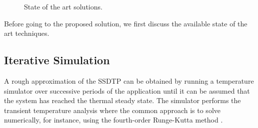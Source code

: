 \begin{figure}[t]
  \centering
  \caption{State of the art solutions.}
\end{figure}
Before going to the proposed solution, we first discuss the available state of the art techniques.

\subsection{Iterative Simulation} \label{sec:hotspot-iterative-solution}
A rough approximation of the SSDTP can be obtained by running a temperature simulator over successive periods of the application until it can be assumed that the system has reached the thermal steady state. The simulator performs the transient temperature analysis where the common approach is to solve  numerically, for instance, using the fourth-order Runge-Kutta method \cite{press2007}.

